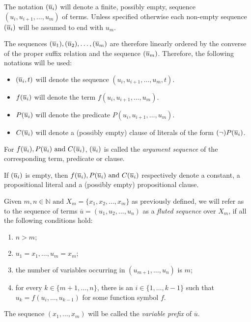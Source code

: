 The notation \(\flseq{i}\) will denote a finite, possibly empty, sequence \((u_i,u_{i+1}, \ldots, u_m)\) of terms. Unless specified otherwise each non-empty sequence \(\flseq{i}\) will be assumed to end with \(u_m\).

The sequences \(\flseq{1},\flseq{2},\ldots,\flseq{m}\) are therefore linearly ordered by the converse of the proper suffix relation and the sequence \(\flseq{m}\).
Therefore, the following notations will be used:
\begin{itemize}
  \item \(\flseq{i}[t]\) will denote the sequence \((u_i,u_{i+1}, \ldots, u_m,t)\).
  \item \(f\flseq{i}\) will denote the term \(f(u_i,u_{i+1}, \ldots, u_m)\).
  \item \(P\flseq{i}\) will denote the predicate \(P(u_i,u_{i+1}, \ldots, u_m)\).
  \item \(C\flseq{i}\) will denote a (possibly empty) clause of literals of the form \((\neg)P\flseq{i}\).
\end{itemize}

For \(f\flseq{i},P\flseq{i} \text{ and } C\flseq{i} \), \(\flseq{i}\) is called the \emph{argument sequence} of the corresponding term, predicate or clause.

If \(\flseq{i}\) is empty, then \(f\flseq{i}, P\flseq{i} \text{ and } C\flseq{i}\) respectively denote a constant, a propositional literal and a (possibly empty) propositional clause.

\begin{definition}\label{def:fluted-sequence}
Given \(m,n \in \mathbb{N} \text{ and } X_m = \{x_1,x_2,\ldots,x_m\}\) as previously defined, we will refer as to the sequence of terms \(\overline{u} = (u_1,u_2,\ldots,u_n)\) as a \emph{fluted sequence} over \(X_m\), if all the following conditions hold:
\begin{enumerate}[label= (\roman*)]
  \item \(n > m\);
  \item \(u_1=x_1,\ldots,u_m=x_m\);
  \item the number of variables occurring in \((u_{m+1},\ldots,u_n)\) is \(m\);
  \item for every \(k \in \{m+1,\ldots,n\}\), there is an \(i \in \{1,\ldots,k-1\}\) such that \\\(u_k = f(u_i,\ldots,u_{k-1})\) for some function symbol \(f\).
\end{enumerate}
The sequence \((x_1, \ldots, x_m)\) will be called the \emph{variable prefix} of \(\overline{u}\).
\end{definition}


